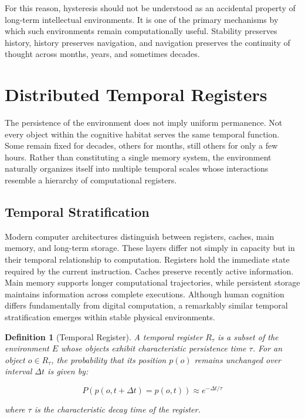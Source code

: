 \documentclass[12pt,oneside]{article}
\newtheorem{definition}{Definition}[section]
\theoremstyle{remark}
\begin{document}
For this reason, hysteresis should not be understood as an accidental property of long-term intellectual environments. It is one of the primary mechanisms by which such environments remain computationally useful. Stability preserves history, history preserves navigation, and navigation preserves the continuity of thought across months, years, and sometimes decades.


\section{Distributed Temporal Registers}

The persistence of the environment does not imply uniform permanence. Not every object within the cognitive habitat serves the same temporal function. Some remain fixed for decades, others for months, still others for only a few hours. Rather than constituting a single memory system, the environment naturally organizes itself into multiple temporal scales whose interactions resemble a hierarchy of computational registers.

\subsection{Temporal Stratification}

Modern computer architectures distinguish between registers, caches, main memory, and long-term storage. These layers differ not simply in capacity but in their temporal relationship to computation. Registers hold the immediate state required by the current instruction. Caches preserve recently active information. Main memory supports longer computational trajectories, while persistent storage maintains information across complete executions. Although human cognition differs fundamentally from digital computation, a remarkably similar temporal stratification emerges within stable physical environments.

\begin{definition}[Temporal Register]
A temporal register $R_\tau$ is a subset of the environment $E$ whose objects exhibit characteristic persistence time $\tau$. For an object $o \in R_\tau$, the probability that its position $p(o)$ remains unchanged over interval $\Delta t$ is given by:

\begin{equation}
P(p(o, t + \Delta t) = p(o, t)) \approx e^{-\Delta t / \tau}
\end{equation}

where $\tau$ is the characteristic decay time of the register.
\end{definition}
\end{document}
